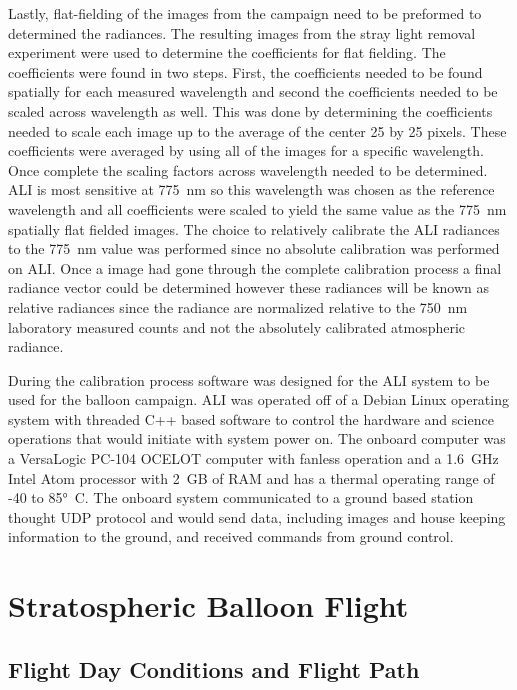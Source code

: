 \documentclass[12pt]{article}
\begin{document}
Lastly, flat-fielding of the images from the campaign need to be preformed to determined the radiances. The resulting images from the stray light removal experiment were used to determine the coefficients for flat fielding. The coefficients were found in two steps. First, the coefficients needed to be found spatially for each measured wavelength and second the coefficients needed to be scaled across wavelength as well. This was done by determining the coefficients needed to scale each image up to the average of the center 25 by 25 pixels. These coefficients were averaged by using all of the images for a specific wavelength. Once complete the scaling factors across wavelength needed to be determined. ALI is most sensitive at 775~nm so this wavelength was chosen as the reference wavelength and all coefficients were scaled to yield the same value as the 775~nm spatially flat fielded images. The choice to relatively calibrate the ALI radiances to the 775~nm value was performed since no absolute calibration was performed on ALI. Once a image had gone through the complete calibration process a final radiance vector could be determined however these radiances will be known as relative radiances since the radiance are normalized relative to the 750~nm laboratory measured counts and not the absolutely calibrated atmospheric radiance.

During the calibration process software was designed for the ALI system to be used for the balloon campaign. ALI was operated off of a Debian Linux operating system with threaded C++ based software to control the hardware and science operations that would initiate with system power on. The onboard computer was a VersaLogic PC-104 OCELOT computer with fanless operation and a 1.6~GHz Intel Atom processor with 2~GB of RAM and has a thermal operating range of -40 to 85\si{\degree C}. The onboard system communicated to a ground based station thought UDP protocol and would send data, including images and house keeping information to the ground, and received commands from ground control.

\section{Stratospheric Balloon Flight}

\subsection{Flight Day Conditions and Flight Path}
\end{document}
